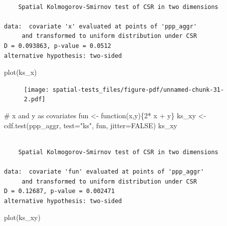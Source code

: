 \documentclass[
  letterpaper,
]{book}
\newenvironment{Shaded}{\begin{snugshade}}{\end{snugshade}}
\newcommand{\AttributeTok}[1]{\textcolor[rgb]{0.40,0.45,0.13}{#1}}
\newcommand{\CommentTok}[1]{\textcolor[rgb]{0.37,0.37,0.37}{#1}}
\newcommand{\ConstantTok}[1]{\textcolor[rgb]{0.56,0.35,0.01}{#1}}
\newcommand{\ControlFlowTok}[1]{\textcolor[rgb]{0.00,0.23,0.31}{#1}}
\newcommand{\DecValTok}[1]{\textcolor[rgb]{0.68,0.00,0.00}{#1}}
\newcommand{\FunctionTok}[1]{\textcolor[rgb]{0.28,0.35,0.67}{#1}}
\newcommand{\NormalTok}[1]{\textcolor[rgb]{0.00,0.23,0.31}{#1}}
\newcommand{\OtherTok}[1]{\textcolor[rgb]{0.00,0.23,0.31}{#1}}
\newcommand{\SpecialCharTok}[1]{\textcolor[rgb]{0.37,0.37,0.37}{#1}}
\newcommand{\StringTok}[1]{\textcolor[rgb]{0.13,0.47,0.30}{#1}}
\begin{document}
\begin{verbatim}

    Spatial Kolmogorov-Smirnov test of CSR in two dimensions

data:  covariate 'x' evaluated at points of 'ppp_aggr' 
     and transformed to uniform distribution under CSR
D = 0.093863, p-value = 0.0512
alternative hypothesis: two-sided
\end{verbatim}

\begin{Shaded}
\begin{Highlighting}[]
\FunctionTok{plot}\NormalTok{(ks\_x)}
\end{Highlighting}
\end{Shaded}

\begin{figure}[H]

{\centering \texttt{[image: spatial-tests\_files/figure-pdf/unnamed-chunk-31-2.pdf]}

}

\end{figure}

\begin{Shaded}
\begin{Highlighting}[]
\CommentTok{\# x and y as covariates}
\NormalTok{fun }\OtherTok{\textless{}{-}} \ControlFlowTok{function}\NormalTok{(x,y)\{}\DecValTok{2}\SpecialCharTok{*}\NormalTok{ x }\SpecialCharTok{+}\NormalTok{ y\}}
\NormalTok{ks\_xy }\OtherTok{\textless{}{-}} \FunctionTok{cdf.test}\NormalTok{(ppp\_aggr, }\AttributeTok{test=}\StringTok{"ks"}\NormalTok{, fun, }\AttributeTok{jitter=}\ConstantTok{FALSE}\NormalTok{)}
\NormalTok{ks\_xy}
\end{Highlighting}
\end{Shaded}

\begin{verbatim}

    Spatial Kolmogorov-Smirnov test of CSR in two dimensions

data:  covariate 'fun' evaluated at points of 'ppp_aggr' 
     and transformed to uniform distribution under CSR
D = 0.12687, p-value = 0.002471
alternative hypothesis: two-sided
\end{verbatim}

\begin{Shaded}
\begin{Highlighting}[]
\FunctionTok{plot}\NormalTok{(ks\_xy)}
\end{Highlighting}
\end{Shaded}
\end{document}
